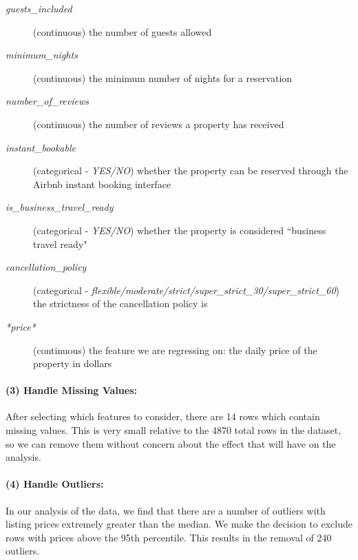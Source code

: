 \documentclass[11pt]{article}
\begin{document}
\begin{description}
                    \item[\textit{guests\_included}] (continuous) the number of guests allowed
                    
                    \item[\textit{minimum\_nights}] (continuous) the minimum number of nights for a reservation
                    
                    \item[\textit{number\_of\_reviews}] (continuous) the number of reviews a property has received
                    
                    \item[\textit{instant\_bookable}] (categorical - \textit{YES/NO}) whether the property can be reserved through the Airbnb instant booking interface 
                    
                    \item[\textit{is\_business\_travel\_ready}] (categorical - \textit{YES/NO}) whether the property is considered ``business travel ready" 
                    
                    \item[\textit{cancellation\_policy}] (categorical - \textit{flexible/moderate/strict/super\_strict\_30/super\_strict\_60}) the strictness of the cancellation policy is
                    
                    \item[\textit{*price*}] (continuous) the feature we are regressing on: the daily price of the property in dollars
	
                \end{description}
             
             \paragraph{(3) Handle Missing Values:}
             	After selecting which features to consider, there are 14 rows which contain missing values. This is very small relative to the 4870 total rows in the dataset, so we can remove them without concern about the effect that will have on the analysis.
                
             \paragraph{(4) Handle Outliers:}
             	In our analysis of the data, we find that there are a number of outliers with listing prices extremely greater than the median. We make the decision to exclude rows with prices above the 95th percentile. This results in the removal of 240 outliers.
                
\end{document}
